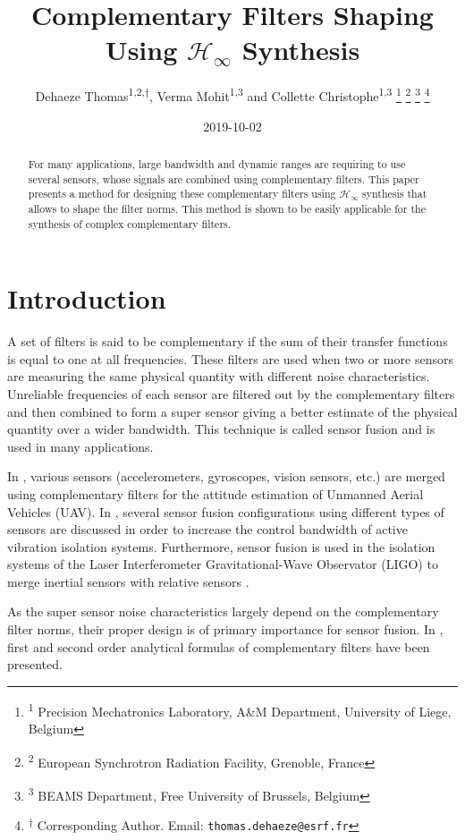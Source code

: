 \documentclass[letterpaper, 10 pt, conference]{ieeeconf}
\author{Dehaeze Thomas\textsuperscript{1,2,$\dagger$}, Verma Mohit\textsuperscript{1,3} and Collette Christophe\textsuperscript{1,3}  \thanks{\textsuperscript{1} Precision Mechatronics Laboratory, A\&M Department, University of Liege, Belgium} \thanks{\textsuperscript{2} European Synchrotron Radiation Facility, Grenoble, France} \thanks{\textsuperscript{3} BEAMS Department, Free University of Brussels, Belgium} \thanks{\textsuperscript{$\dagger$} Corresponding Author. Email: {\tt\small thomas.dehaeze@esrf.fr}}}
\date{2019-10-02}
\title{Complementary Filters Shaping Using \(\mathcal{H}_\infty\) Synthesis}
\begin{document}
\maketitle


\begin{abstract}
For many applications, large bandwidth and dynamic ranges are requiring to use several sensors, whose signals are combined using complementary filters.
This paper presents a method for designing these complementary filters using \(\mathcal{H}_\infty\) synthesis that allows to shape the filter norms.
This method is shown to be easily applicable for the synthesis of complex complementary filters.
\end{abstract}

\section{Introduction}
\label{sec:orgcdf7cd8}
\label{sec:introduction}
A set of filters is said to be complementary if the sum of their transfer functions is equal to one at all frequencies.
These filters are used when two or more sensors are measuring the same physical quantity with different noise characteristics. Unreliable frequencies of each sensor are filtered out by the complementary filters and then combined to form a super sensor giving a better estimate of the physical quantity over a wider bandwidth.
This technique is called sensor fusion and is used in many applications.\par
In \cite{zimmermann92_high_bandw_orien_measur_contr,corke04_inert_visual_sensin_system_small_auton_helic,min15_compl_filter_desig_angle_estim}, various sensors (accelerometers, gyroscopes, vision sensors, etc.) are merged using complementary filters for the attitude estimation of Unmanned Aerial Vehicles (UAV).
In \cite{collette15_sensor_fusion_method_high_perfor}, several sensor fusion configurations using different types of sensors are discussed in order to increase the control bandwidth of active vibration isolation systems.
Furthermore, sensor fusion is used in the isolation systems of the Laser Interferometer Gravitational-Wave Observator (LIGO) to merge inertial sensors with relative sensors
\cite{matichard15_seism_isolat_advan_ligo,hua04_polyp_fir_compl_filter_contr_system}. \par
As the super sensor noise characteristics largely depend on the complementary filter norms, their proper design is of primary importance for sensor fusion.
In \cite{corke04_inert_visual_sensin_system_small_auton_helic,jensen13_basic_uas,min15_compl_filter_desig_angle_estim}, first and second order analytical formulas of complementary filters have been presented.
\end{document}
